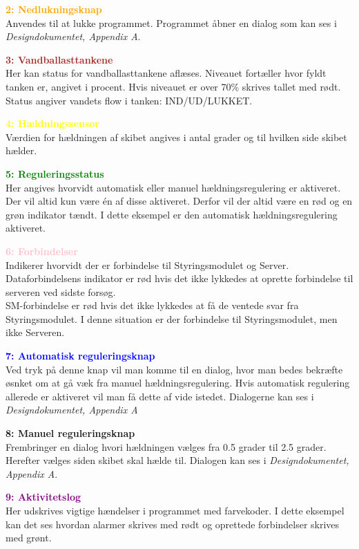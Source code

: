 \textcolor{Orange}{\textbf{2: Nedlukningsknap}}\\
Anvendes til at lukke programmet. Programmet åbner en dialog som kan ses i \textit{Designdokumentet, Appendix A}.

\textcolor{brown}{\textbf{3: Vandballasttankene}}\\
Her kan status for vandballasttankene aflæses. Niveauet fortæller hvor fyldt tanken er, angivet i procent. Hvis niveauet er over 70\% skrives tallet med rødt.
Status angiver vandets flow i tanken: IND/UD/LUKKET.

\textcolor{yellow}{\textbf{4: Hældningssensor}}\\
Værdien for hældningen af skibet angives i antal grader og til hvilken side skibet hælder.

\textcolor{green}{\textbf{5: Reguleringsstatus}}\\
Her angives hvorvidt automatisk eller manuel hældningsregulering er aktiveret. Der vil altid kun være én af disse aktiveret. Derfor vil der altid være en rød og en grøn indikator tændt. I dette eksempel er den automatisk hældningsregulering aktiveret.
	
\textcolor{pink}{\textbf{6: Forbindelser}}\\
Indikerer hvorvidt der er forbindelse til Styringsmodulet og Server. Dataforbindelsens indikator er rød hvis det ikke lykkedes at oprette forbindelse til serveren ved sidste forsøg.\\
SM-forbindelse er rød hvis det ikke lykkedes at få de ventede svar fra Styringsmodulet.
I denne situation er der forbindelse til Styringsmodulet, men ikke Serveren.

\textcolor{blue}{\textbf{7: Automatisk reguleringsknap}}\\
Ved tryk på denne knap vil man komme til en dialog, hvor man bedes bekræfte øsnket om at gå væk fra manuel hældningsregulering. Hvis automatisk regulering allerede er aktiveret vil man få dette af vide istedet. Dialogerne kan ses i \textit{Designdokumentet, Appendix A}

\textcolor{BlueGreen}{\textbf{8: Manuel reguleringsknap}}\\
Frembringer en dialog hvori hældningen vælges fra 0.5 grader til 2.5 grader. Herefter vælges siden skibet skal hælde til. Dialogen kan ses i \textit{Designdokumentet, Appendix A}.

\textcolor{purple}{\textbf{9: Aktivitetslog}}\\
Her udskrives vigtige hændelser i programmet med farvekoder. I dette eksempel kan det ses hvordan alarmer skrives med rødt og oprettede forbindelser skrives med grønt.

